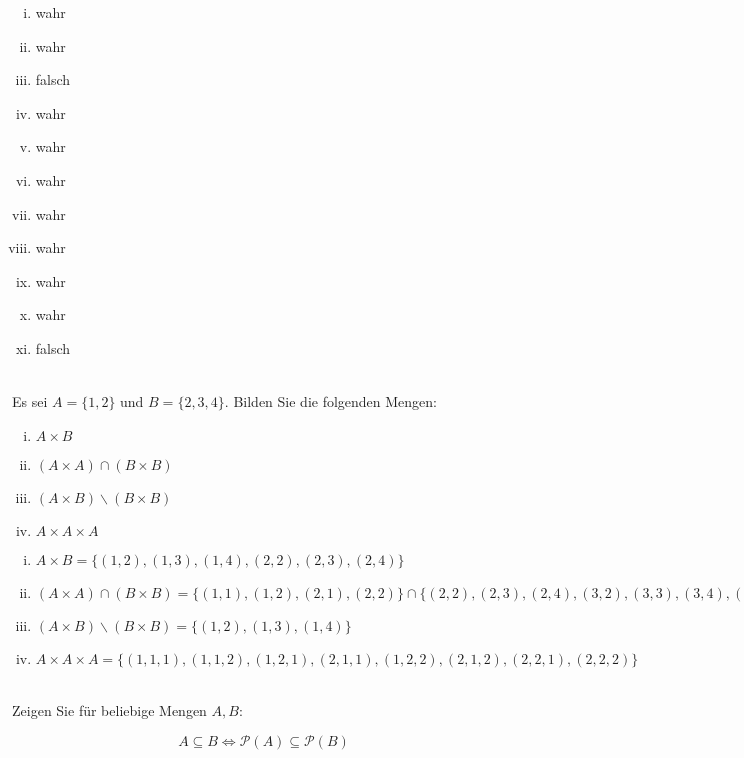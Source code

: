 \begin{loesung}
  \begin{enumerate}[(i)]
    \item wahr
    \item wahr
    \item falsch
    \item wahr
    \item wahr
    \item wahr
    \item wahr
    \item wahr
    \item wahr
    \item wahr
    \item falsch
  \end{enumerate}
\end{loesung}

\\
Es sei $A=\{1,2\}$ und $B=\{2,3,4\}$.
Bilden Sie die folgenden Mengen:
\begin{enumerate}[(i)]
  \item $A\times B$
  \item $(A\times A)\cap (B\times B)$
  \item $(A\times B)\backslash (B\times B)$
  \item $A\times A\times A$
\end{enumerate}

\begin{loesung}
  \begin{enumerate}[(i)]
    \item $A\times B=\{(1,2),(1,3),(1,4),(2,2),(2,3),(2,4)\}$
    \item $(A\times A)\cap (B\times B)=\{(1,1),(1,2),(2,1),(2,2)\}\cap\{(2,2),(2,3),(2,4),(3,2),(3,3),(3,4),(4,2),(4,3),(4,4)\}=\{(2,2)\}$
    \item $(A\times B)\backslash (B\times B)=\{(1,2),(1,3),(1,4)\}$
    \item $A\times A\times A=\{(1,1,1),(1,1,2),(1,2,1),(2,1,1),(1,2,2),(2,1,2),(2,2,1),(2,2,2)\}$
  \end{enumerate}
\end{loesung}

\\
Zeigen Sie für beliebige Mengen $A,B$:

  \[A\subseteq B\Leftrightarrow \mathscr{P}(A)\subseteq\mathscr{P}(B)\]


